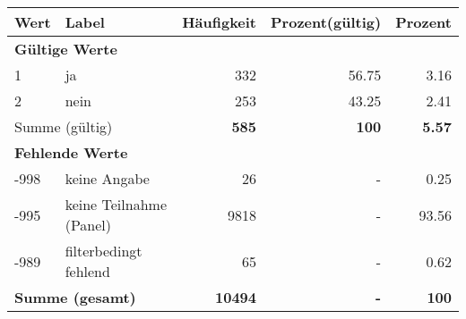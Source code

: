      \begin{longtable}{lXrrr}
     \toprule
     \textbf{Wert} & \textbf{Label} & \textbf{Häufigkeit} & \textbf{Prozent(gültig)} & \textbf{Prozent} \\
     \endhead
     \midrule
     \multicolumn{5}{l}{\textbf{Gültige Werte}}\\

     1 &
     \multicolumn{1}{X}{ ja   } &


       \num{332} &
       \num[round-mode=places,round-precision=2]{56.75} &
         \num[round-mode=places,round-precision=2]{3.16} \\

     2 &
     \multicolumn{1}{X}{ nein   } &


       \num{253} &
       \num[round-mode=places,round-precision=2]{43.25} &
         \num[round-mode=places,round-precision=2]{2.41} \\
     \midrule
     \multicolumn{2}{l}{Summe (gültig)} &
       \textbf{\num{585}} &
     \textbf{\num{100}} &
       \textbf{\num[round-mode=places,round-precision=2]{5.57}} \\
     \multicolumn{5}{l}{\textbf{Fehlende Werte}}\\
       -998 &
       keine Angabe &
         \num{26} &
        - &
         \num[round-mode=places,round-precision=2]{0.25} \\
       -995 &
       keine Teilnahme (Panel) &
         \num{9818} &
        - &
         \num[round-mode=places,round-precision=2]{93.56} \\
       -989 &
       filterbedingt fehlend &
         \num{65} &
        - &
         \num[round-mode=places,round-precision=2]{0.62} \\
     \midrule
     \multicolumn{2}{l}{\textbf{Summe (gesamt)}} &
          \textbf{\num{10494}} &
        \textbf{-} &
        \textbf{\num{100}} \\
     \bottomrule
     \end{longtable}
     

